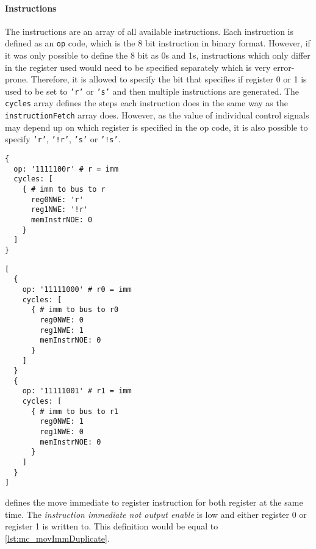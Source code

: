 \paragraph{Instructions} The instructions are an array of all available instructions.
Each instruction is defined as an \texttt{op} code, which is the 8 bit instruction in binary format.
However, if it was only possible to define the 8 bit as 0s and 1s, instructions which only differ in the register used would need to be specified separately which is very error-prone.
Therefore, it is allowed to specify the bit that specifies if register 0 or 1 is used to be set to \texttt{'r'} or \texttt{'s'} and then multiple instructions are generated.
The \texttt{cycles} array defines the steps each instruction does in the same way as the \texttt{instructionFetch} array does.
However, as the value of individual control signals may depend up on which register is specified in the op code, it is also possible to specify \texttt{'r'}, \texttt{'!r'}, \texttt{'s'} or \texttt{'!s'}.

\begin{listing}[t]
  \begin{sublisting}[b]{.45\textwidth}
    \begin{verbatim}
{
  op: '1111100r' # r = imm
  cycles: [
    { # imm to bus to r
      reg0NWE: 'r'
      reg1NWE: '!r'
      memInstrNOE: 0
    }
  ]
}
    \end{verbatim}
    \caption{Definition using `r' in the opcode.}
    \label{lst:mc_movImm}
  \end{sublisting}
  \begin{sublisting}[b]{.5\textwidth}
    \begin{verbatim}
[
  {
    op: '11111000' # r0 = imm
    cycles: [
      { # imm to bus to r0
        reg0NWE: 0
        reg1NWE: 1
        memInstrNOE: 0
      }
    ]
  }
  {
    op: '11111001' # r1 = imm
    cycles: [
      { # imm to bus to r1
        reg0NWE: 1
        reg1NWE: 0
        memInstrNOE: 0
      }
    ]
  }
]
    \end{verbatim}
    \caption{Equivalent definition of both separate instructions.}
    \label{lst:mc_movImmDuplicate}
  \end{sublisting}
  \caption{Definition of the move immediate to register instruction for the microcode generation.}
\end{listing}
 defines the move immediate to register instruction for both register at the same time.
The \emph{instruction immediate not output enable} is low and either register 0 or register 1 is written to.
This definition would be equal to \cref{lst:mc_movImmDuplicate}.

